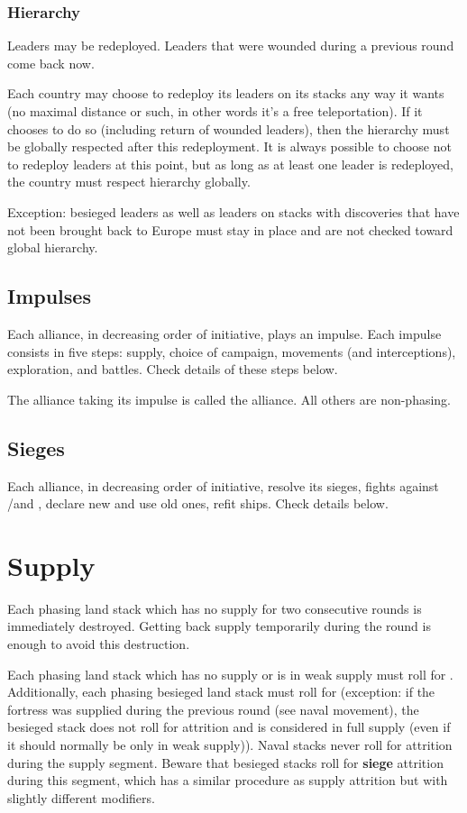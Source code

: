 \subsubsection{Hierarchy}
Leaders may be redeployed. Leaders that were wounded during a previous round
come back now.

Each country may choose to redeploy its leaders on its stacks any way it wants
(no maximal distance or such, in other words it's a free teleportation). If it
chooses to do so (including return of wounded leaders), then the hierarchy
must be globally respected after this redeployment. It is always possible to
choose not to redeploy leaders at this point, but as long as at least one
leader is redeployed, the country must respect hierarchy globally.

Exception: besieged leaders as well as leaders on stacks with discoveries that
have not been brought back to Europe must stay in place and are not checked
toward global hierarchy.

\subsection{Impulses}
Each alliance, in decreasing order of initiative, plays an impulse. Each
impulse consists in five steps: supply, choice of campaign, movements (and
interceptions), exploration, and battles. Check details of these steps below.

The alliance taking its impulse is called the  alliance. All
others are non-phasing.

\subsection{Sieges}
Each alliance, in decreasing order of initiative, resolve its sieges, fights
against \REVOLT/\REBELLION and \corsaire, declare new  and use old ones, refit  ships. Check details below.

\section{Supply}
\label{chMilitary:Supply}
Each phasing land stack which has no supply for two consecutive rounds is
immediately destroyed. Getting back supply temporarily during the round is
enough to avoid this destruction.

Each phasing land stack which has no supply or is in weak supply must roll for
. Additionally, each phasing besieged land stack must
roll for  (exception: if the fortress was supplied
during the previous round (see naval movement), the besieged stack does not
roll for attrition and is considered in full supply (even if it should
normally be only in weak supply)). Naval stacks never roll for attrition
during the supply segment. Beware that besieged stacks roll for \textbf{siege}
attrition during this segment, which has a similar procedure as supply
attrition but with slightly different modifiers.

